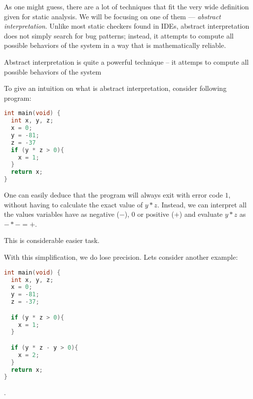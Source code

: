 \documentclass[..thesis.tex]{subfiles}
\begin{document}
As one might guess, there are a lot of techniques that fit the very wide definition given for static analysis. We will be focusing on one of them --- \textit{abstract interpretation}. Unlike most static checkers found in IDEs, abstract interpretation does not simply search for bug patterns; instead, it attempts to compute all possible behaviors of the system in a way that is mathematically reliable.


Abstract interpretation is quite a powerful technique -- it attemps to compute all possible behaviors of the system 

To give an intuition on what is abstract interpretation, consider following program:

\begin{lstlisting}[language=C,style=def]
int main(void) {
  int x, y, z;
  x = 0;
  y = -81;
  z = -37
  if (y * z > 0){
    x = 1;
  }
  return x;
}
\end{lstlisting}

One can easily deduce that the program will always exit with error code $1$, without having to calculate the exact value of  $y*z$.
Instead, we can interpret all the values variables have as negative ($-$), $0$ or positive ($+$) and evaluate $y * z$ as $-*- = +$.

This is considerable easier task.

With this simplification, we do lose precision. Lets consider another example:

\begin{lstlisting}[language=C,style=def]
int main(void) {
  int x, y, z;
  x = 0;
  y = -81;
  z = -37;

  if (y * z > 0){
    x = 1;
  }

  if (y * z - y > 0){
    x = 2;
  }
  return x;
}
\end{lstlisting}.
\end{document}
